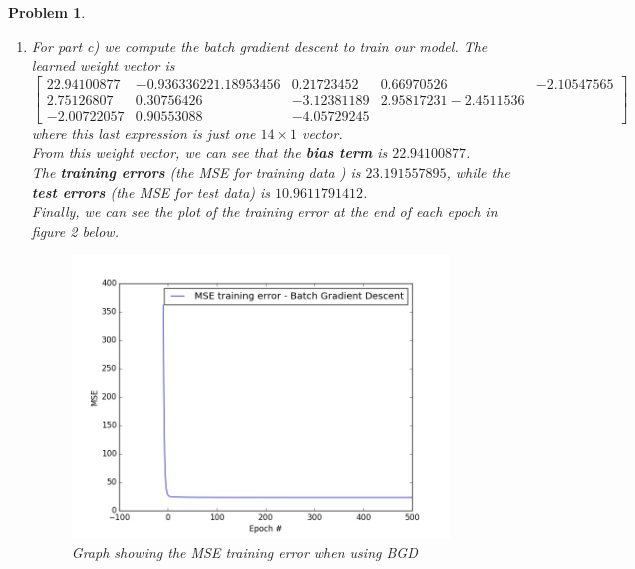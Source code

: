 \documentclass[12pt]{article}
\newtheorem{problem}{Problem}%
\begin{document}
\begin{problem}
\begin{enumerate}
\item For part c) we compute the batch gradient descent to train our model. The learned weight vector is \[\left[\begin{matrix}22.94100877  &-0.93633622   1.18953456 &  0.21723452 &  0.66970526&
  -2.10547565 \\  2.75126807  & 0.30756426  &-3.12381189  & 2.95817231
  -2.4511536 \\  -2.00722057 &  0.90553088 & -4.05729245 \end{matrix}\right]\]
  where this last expression is just one $14 \times 1$ vector.\\
 From this weight vector, we can see that the \textbf{bias term} is $22.94100877$.\\

The \textbf{training errors} (the MSE for training data ) is $23.191557895$, while the \textbf{test errors} (the MSE for test data) is $10.9611791412$.\\

 Finally, we can see the plot of the training error at the end of each epoch in figure 2 below.

\begin{figure}[h]
\centering
\includegraphics[width=10cm]{MSE_training_error_BGD.jpg}
\caption{Graph showing the MSE training error when using BGD}
\end{figure}


\end{enumerate}
\end{problem}
\end{document}
